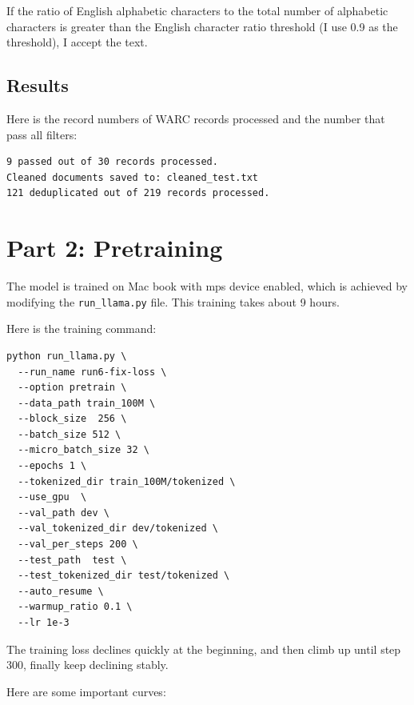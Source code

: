 \documentclass[11pt,a4paper]{article}
\begin{document}
If the ratio of English alphabetic characters to the total number of alphabetic characters is greater than the English character ratio threshold (I use 0.9 as the threshold), I accept the text.

\subsection{Results}

Here is the record numbers of WARC records processed and the number that pass all filters:


\begin{lstlisting}
9 passed out of 30 records processed.
Cleaned documents saved to: cleaned_test.txt
121 deduplicated out of 219 records processed.
\end{lstlisting}

\section{Part 2: Pretraining}

The model is trained on Mac book with mps device enabled, which is achieved by modifying the \texttt{run\_llama.py} file. This training takes about 9 hours.

Here is the training command:
\begin{lstlisting}
python run_llama.py \
  --run_name run6-fix-loss \
  --option pretrain \
  --data_path train_100M \
  --block_size  256 \
  --batch_size 512 \
  --micro_batch_size 32 \
  --epochs 1 \
  --tokenized_dir train_100M/tokenized \
  --use_gpu  \
  --val_path dev \
  --val_tokenized_dir dev/tokenized \
  --val_per_steps 200 \
  --test_path  test \
  --test_tokenized_dir test/tokenized \
  --auto_resume \
  --warmup_ratio 0.1 \
  --lr 1e-3 
\end{lstlisting}

The training loss declines quickly at the beginning, and then climb up until step 300, finally keep declining stably.

Here are some important curves:
\end{document}
